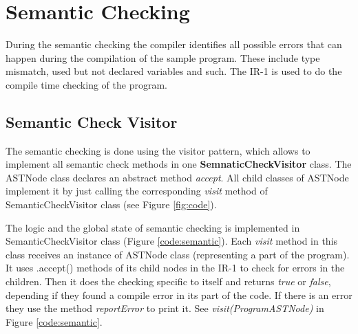 \documentclass{article}[11pt]
\begin{document}
\section{Semantic Checking}
\label{sec:semantic}
During the semantic checking the compiler identifies all possible errors that can happen during the compilation of the sample program. These include type mismatch, used but not declared variables and such. The IR-1 is used to do the compile time checking of the program.

\subsection{Semantic Check Visitor}
The semantic checking is done using the visitor pattern, which allows to implement all semantic check methods in one \textbf{SemnaticCheckVisitor} class. The ASTNode class declares an abstract method \textit{accept}. All child classes of ASTNode implement it by just calling the corresponding \textit{visit} method of SemanticCheckVisitor class (see Figure \ref{fig:code}).

The logic and the global state of semantic checking is implemented in SemanticCheckVisitor class (Figure \ref{code:semantic}). Each \textit{visit} method in this class receives an instance of ASTNode class (representing a part of the program). It uses .accept() methods of its child nodes in the IR-1 to check for errors in the children. Then it does the checking specific to itself and returns \textit{true} or \textit{false}, depending if they found a compile error in its part of the code. If there is an error they use the method \textit{reportError} to print it. See \textit{visit(ProgramASTNode)} in Figure \ref{code:semantic}.
\end{document}

